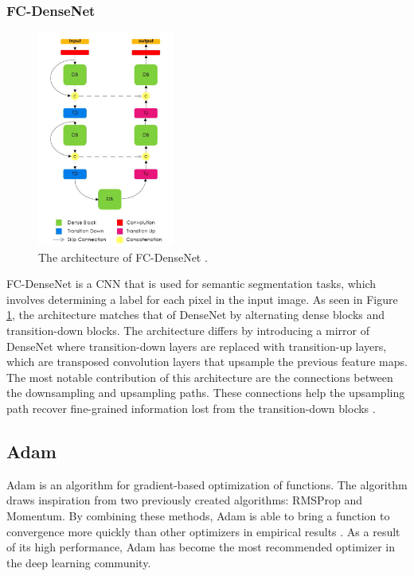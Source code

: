 
\subsubsection{FC-DenseNet}
\begin{figure}
    \centering
    \includegraphics[width=0.40\textwidth]{images/fc-densenet.png}
    \caption{The architecture of FC-DenseNet \cite{fc-densenet}.}
    \label{fc-densenet}
\end{figure}
FC-DenseNet is a CNN that is used for semantic segmentation tasks, which involves determining a label for each pixel in the input image. As seen in Figure \ref{fc-densenet}, the architecture matches that of DenseNet by alternating dense blocks and transition-down blocks. The architecture differs by introducing a mirror of DenseNet where transition-down layers are replaced with transition-up layers, which are transposed convolution layers that upsample the previous feature maps. The most notable contribution of this architecture are the connections between the downsampling and upsampling paths. These connections help the upsampling path recover fine-grained information lost from the transition-down blocks \cite{fc-densenet}.

\subsection{Adam}
Adam is an algorithm for gradient-based optimization of functions. The algorithm draws inspiration from two previously created algorithms: RMSProp and Momentum. By combining these methods, Adam is able to bring a function to convergence more quickly than other optimizers in empirical results \cite{adam}. As a result of its high performance, Adam has become the most recommended optimizer in the deep learning community.
